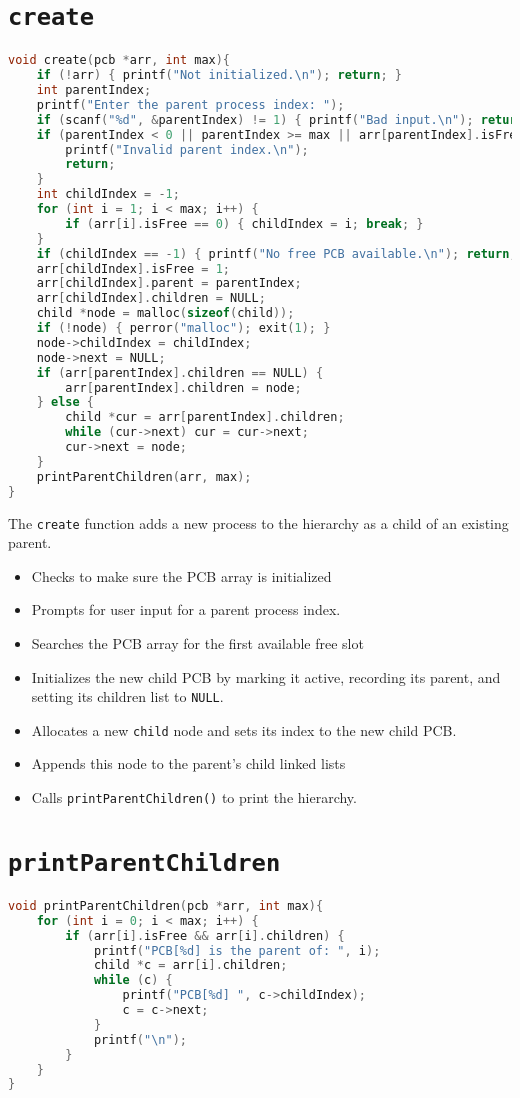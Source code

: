 \documentclass[12pt]{article}
\begin{document}
\newpage
\section*{\texttt{create} }
\begin{lstlisting}[language=C]
void create(pcb *arr, int max){
    if (!arr) { printf("Not initialized.\n"); return; }
    int parentIndex;
    printf("Enter the parent process index: ");
    if (scanf("%d", &parentIndex) != 1) { printf("Bad input.\n"); return; }
    if (parentIndex < 0 || parentIndex >= max || arr[parentIndex].isFree == 0) {
        printf("Invalid parent index.\n");
        return;
    }
    int childIndex = -1;
    for (int i = 1; i < max; i++) {
        if (arr[i].isFree == 0) { childIndex = i; break; }
    }
    if (childIndex == -1) { printf("No free PCB available.\n"); return; }
    arr[childIndex].isFree = 1;
    arr[childIndex].parent = parentIndex;
    arr[childIndex].children = NULL;
    child *node = malloc(sizeof(child));
    if (!node) { perror("malloc"); exit(1); }
    node->childIndex = childIndex;
    node->next = NULL;
    if (arr[parentIndex].children == NULL) {
        arr[parentIndex].children = node;
    } else {
        child *cur = arr[parentIndex].children;
        while (cur->next) cur = cur->next;
        cur->next = node;
    }
    printParentChildren(arr, max);
}
\end{lstlisting}

The \texttt{create} function adds a new process to the hierarchy as a child of an existing parent.
\begin{itemize}
  \item Checks to make sure the PCB array is initialized  
  \item Prompts for user input for a parent process index.
    \item Searches the PCB array for the first available free slot  
  \item Initializes the new child PCB by marking it active, recording its parent, and setting its children list to \texttt{NULL}.
  \item Allocates a new \texttt{child} node and sets its index to the new child PCB.
  \item Appends this node to the parent’s child linked lists
  \item Calls \texttt{printParentChildren()} to print the hierarchy.
\end{itemize}
\newpage
\section*{\texttt{printParentChildren}}
\begin{lstlisting}[language=C]
void printParentChildren(pcb *arr, int max){
    for (int i = 0; i < max; i++) {
        if (arr[i].isFree && arr[i].children) {
            printf("PCB[%d] is the parent of: ", i);
            child *c = arr[i].children;
            while (c) { 
                printf("PCB[%d] ", c->childIndex); 
                c = c->next; 
            }
            printf("\n");
        }
    }
}
\end{lstlisting}
\end{document}
